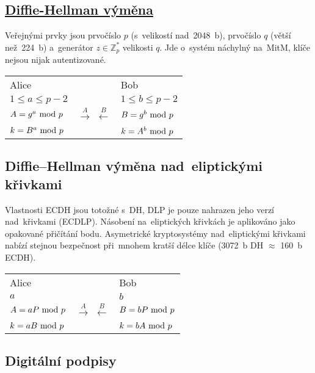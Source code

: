 \subsection[Diffie--Hellman výměna]{\href{https://en.wikipedia.org/wiki/Diffie-Hellman_key_exchange}{Diffie-Hellman výměna}}

Veřejnými prvky jsou prvočíslo $p$ (s~velikostí nad~2048~b), prvočíslo $q$ (větší než~224~b) a~generátor $z \in \mathbb{Z}_p^*$ velikosti $q$. Jde o~systém náchylný na~MitM, klíče nejsou nijak autentizované.

\begin{table}[ht]
\begin{tabular}{lcl}
Alice && Bob \\
$1 \le a \le p-2$ && $1 \le b \le p-2$ \\
$A = g^a \ \mathrm{mod}\ p$ & $\stackrel{A}{\rightarrow}$ $\stackrel{B}{\leftarrow}$ & $B = g^b \ \mathrm{mod}\ p$ \\
$k = B^a \ \mathrm{mod}\ p$ && $k = A^b \ \mathrm{mod}\ p$ \\
\end{tabular}
\end{table}

\subsection{Diffie--Hellman výměna nad~eliptickými křivkami}

Vlastnosti ECDH jsou totožné s~DH, DLP je pouze nahrazen jeho verzí nad~křivkami (ECDLP). Násobení na~eliptických křivkách je aplikováno jako opakované přičítání bodu. Asymetrické kryptosystémy nad~eliptickými křivkami nabízí stejnou bezpečnost při~mnohem kratší délce klíče (3072~b DH $\approx$ 160~b ECDH).

\begin{table}[ht]
\begin{tabular}{lcl}
Alice && Bob \\
$a$ && $b$ \\
$A = aP \ \mathrm{mod}\ p$ & $\stackrel{A}{\rightarrow}$ $\stackrel{B}{\leftarrow}$ & $B = bP \ \mathrm{mod}\ p$ \\
$k = aB \ \mathrm{mod}\ p$ && $k = bA \ \mathrm{mod}\ p$ \\
\end{tabular}
\end{table}

\subsection{Digitální podpisy}

